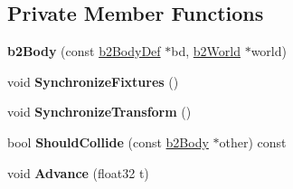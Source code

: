 \subsection*{Private Member Functions}
\begin{DoxyCompactItemize}
\item 
{\bfseries b2\+Body} (const \hyperlink{structb2_body_def}{b2\+Body\+Def} $\ast$bd, \hyperlink{classb2_world}{b2\+World} $\ast$world)\hypertarget{classb2_body_a3d2589a2eb6a76898660b41092141d13}{}\label{classb2_body_a3d2589a2eb6a76898660b41092141d13}

\item 
void {\bfseries Synchronize\+Fixtures} ()\hypertarget{classb2_body_af8a192d14f97e7a356f6b9cc69fafa10}{}\label{classb2_body_af8a192d14f97e7a356f6b9cc69fafa10}

\item 
void {\bfseries Synchronize\+Transform} ()\hypertarget{classb2_body_a4ce4a12de31c4e877ac5075331cb3a47}{}\label{classb2_body_a4ce4a12de31c4e877ac5075331cb3a47}

\item 
bool {\bfseries Should\+Collide} (const \hyperlink{classb2_body}{b2\+Body} $\ast$other) const \hypertarget{classb2_body_ab124b836dc1f304aa415bfbaa71eff45}{}\label{classb2_body_ab124b836dc1f304aa415bfbaa71eff45}

\item 
void {\bfseries Advance} (float32 t)\hypertarget{classb2_body_a018ca81f6c1bef31942931dfa9459f4f}{}\label{classb2_body_a018ca81f6c1bef31942931dfa9459f4f}

\end{DoxyCompactItemize}
